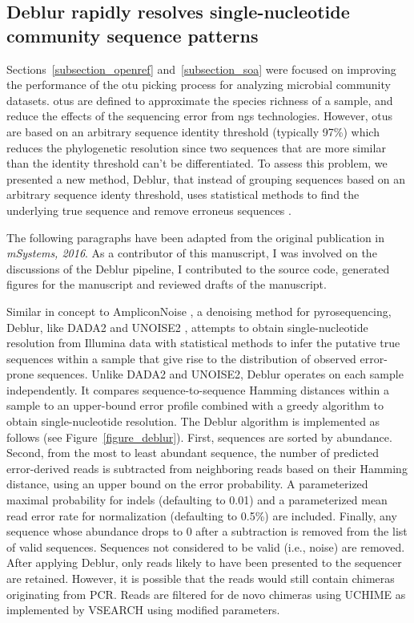 \subsection{Deblur rapidly resolves single-nucleotide community sequence patterns}\label{subsection_deblur}

Sections~\ref{subsection_openref} and~\ref{subsection_soa} were focused on
improving the performance of the \gls{otu} picking process for analyzing
microbial community datasets. \gls{otu}s are defined to approximate the species
richness of a sample, and reduce the effects of the sequencing error from \gls{ngs}
technologies. However, \gls{otu}s are based on an arbitrary sequence identity
threshold (typically 97\%) which reduces the phylogenetic resolution since two
sequences that are more similar than the identity threshold can't be differentiated.
To assess this problem, we presented a new method, Deblur, that instead of grouping
sequences based on an arbitrary sequence identy threshold, uses statistical
methods to find the underlying true sequence and remove erroneus sequences \cite{Amir2017}.

The following paragraphs have been adapted from the original publication in
\textsl{mSystems, 2016}. As a contributor of this manuscript, I was involved on
the discussions of the Deblur pipeline, I contributed to the source code, generated
figures for the manuscript and reviewed drafts of the manuscript.

Similar in concept to AmpliconNoise \cite{Quince2011}, a denoising method for
pyrosequencing, Deblur, like DADA2 \cite{Callahan2016} and UNOISE2 \cite{Edgar2016},
attempts to obtain single-nucleotide resolution from Illumina data with
statistical methods to infer the putative true sequences within a sample that
give rise to the distribution of observed error-prone sequences. Unlike DADA2 and
UNOISE2, Deblur operates on each sample independently. It compares
sequence-to-sequence Hamming distances within a sample to an upper-bound error
profile combined with a greedy algorithm to obtain single-nucleotide resolution.
The Deblur algorithm is implemented as follows (see Figure~\ref{figure_deblur}).
First, sequences are sorted by abundance. Second, from the most to least
abundant sequence, the number of predicted error-derived reads is subtracted
from neighboring reads based on their Hamming distance, using an upper bound on
the error probability. A parameterized maximal probability for indels
(defaulting to 0.01) and a parameterized mean read error rate for normalization
(defaulting to 0.5\%) are included. Finally, any sequence whose abundance drops
to 0 after a subtraction is removed from the list of valid sequences. Sequences
not considered to be valid (i.e., noise) are removed. After applying Deblur,
only reads likely to have been presented to the sequencer are retained.
However, it is possible that the reads would still contain chimeras originating
from PCR. Reads are filtered for de novo chimeras using UCHIME \cite{Edgar2011}
as implemented by VSEARCH \cite{Rognes2016} using modified parameters.

